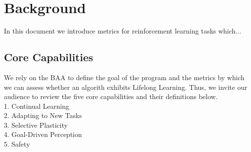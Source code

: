 \chapter{Background}\label{ch:background}

In this document we introduce metrics for reinforcement learning tasks which...

\section{Core Capabilities}
\label{sec:core_capabilities}

We rely on the BAA to define the goal of the program and the metrics by which we can assess whether an algorith exhibits Lifelong Learning. Thus, we invite our audience to review the five core capabilities and their definitions below.\\
1. Continual Learning\\
2. Adapting to New Tasks\\
3. Selective Plasticity\\
4. Goal-Driven Perception\\
5. Safety\\

